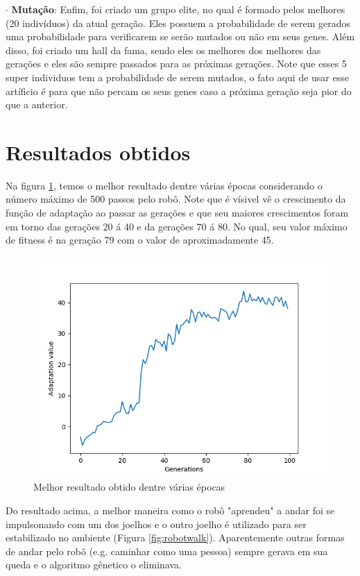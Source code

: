 \documentclass[article, a4paper, 12pt]{article}
\begin{document}
$\cdot$ \textbf{Mutação}: Enfim, foi criado um grupo elite, no qual é formado pelos melhores (20 indivíduos) da atual geração. Eles possuem a probabilidade de serem gerados uma probabilidade para verificarem se serão mutados ou não em seus genes. Além disso, foi criado um hall da fama, sendo eles os melhores dos melhores das gerações e eles são sempre passados para as próximas gerações. Note que esses 5 super individuos tem a probabilidade de serem mutados, o fato aqui de usar esse artíficio é para que não percam os seus genes caso a próxima geração seja pior do que a anterior.

\section{Resultados obtidos}

\hspace{1cm}Na figura \ref{fig:melhor}, temos o melhor resultado dentre várias épocas considerando o número máximo de 500 passos pelo robô. Note que é vísivel vê o crescimento da função de adaptação ao passar as gerações e que seu maiores crescimentos foram em torno das gerações 20 á 40 e da gerações 70 á 80. No qual, seu valor máximo de fitness é na geração 79 com o valor de aproximadamente 45.   

\begin{figure}[!htb]
     \centering
     \includegraphics[scale=0.75]{img/melhor.png}
     \caption{Melhor resultado obtido dentre várias épocas}
     \label{fig:melhor}
\end{figure}

\hspace{0.5cm}Do resultado acima, a melhor maneira como o robô "aprendeu" a andar foi se impulsonando com um dos joelhos e o outro joelho é utilizado para ser estabilizado no ambiente (Figura \ref{fig:robotwalk}). Aparentemente outras formas de andar pelo robô (e.g. caminhar como uma pessoa) sempre gerava em sua queda e o algoritmo gênetico o eliminava.
\end{document}
